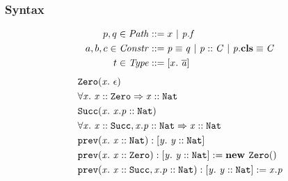 \documentclass[leqno]{beamer}
\begin{document}
\begin{frame}
\frametitle{Syntax}

\begin{align*}
p, q \in \mathit{Path} &::= x \ |\ \mathit{p.f}\\
a, b, c \in \mathit{Constr} &::= \mathit{p} \equiv \mathit{q} ~|~ \mathit{p} :: \mathit{C} ~|~ \mathit{p}.\textbf{cls} \equiv \mathit{C}\\
t \in \mathit{Type} &::= [x.\ \mathit{\overline{a}}]
\end{align*}
\begin{align*}
&\mathit{\texttt{Zero}}(\mathit{x}.\ \mathit{\epsilon})\\
& \forall \mathit{x}.\ \mathit{\mathit{x} :: \mathit{\texttt{Zero}}} \Rightarrow \mathit{\mathit{x} :: \mathit{\texttt{Nat}}}\\
&\mathit{\texttt{Succ}}(\mathit{x}.\ \mathit{\mathit{x.p} :: \mathit{\texttt{Nat}}})\\
& \forall \mathit{x}.\ \mathit{\mathit{x} :: \mathit{\texttt{Succ}}, \mathit{x.p} :: \mathit{\texttt{Nat}}} \Rightarrow \mathit{\mathit{x} :: \mathit{\texttt{Nat}}}\\
&\mathit{\texttt{prev}}(\mathit{x}.\ \mathit{\mathit{x} :: \mathit{\texttt{Nat}}}): \mathit{[y.\ \mathit{\mathit{y} :: \mathit{\texttt{Nat}}}]}\\
&\mathit{\texttt{prev}}(\mathit{x}.\ \mathit{\mathit{x} :: \mathit{\texttt{Zero}}}): \mathit{[y.\ \mathit{\mathit{y} :: \mathit{\texttt{Nat}}}]} := \mathit{\textbf{new } \mathit{\texttt{Zero}}()}\\
&\mathit{\texttt{prev}}(\mathit{x}.\ \mathit{\mathit{x} :: \mathit{\texttt{Succ}}, \mathit{x.p} :: \mathit{\texttt{Nat}}}): \mathit{[y.\ \mathit{\mathit{y} :: \mathit{\texttt{Nat}}}]} := \mathit{x.p}
\end{align*}
\end{frame}
\end{document}
